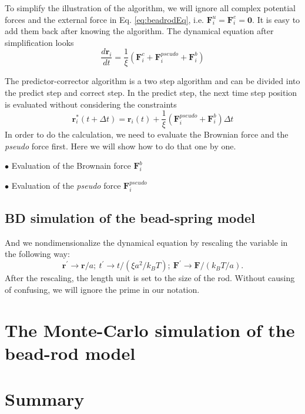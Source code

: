 To simplify the illustration of the algorithm, we will ignore all complex potential forces and the external force in Eq. \eqref{eq:beadrodEq}, i.e. $\mathbf{F}_i^{u} = \mathbf{F}_i^{e} = \mathbf{0}$. It is easy to add them back after knowing the algorithm. The dynamical equation after simplification looks 
\begin{equation}
    \label{eq:beadrodSimple}
    \frac{d \mathbf{r}_i}{d t} = \frac{1}{\xi}\left(\mathbf{F}_i^{c} + \mathbf{F}_i^{pseudo} + \mathbf{F}_i^{b}\right)
\end{equation}

The predictor-corrector algorithm is a two step algorithm and can be divided into the predict step and correct step. In the predict step, the next time step position is evaluated without considering the constraints
\begin{equation}
    \label{eq:beadrodPredict}
    \mathbf{r}_i^*(t+\Delta t) = \mathbf{r}_i(t) + \frac{1}{\xi}(\mathbf{F}_i^{pseudo} + \mathbf{F}_i^{b})\Delta t
\end{equation}
In order to do the calculation, we need to evaluate the Brownian force and the \emph{pseudo} force first. Here we will show how to do that one by one.

$\bullet$ Evaluation of the Brownain force $\mathbf{F}_i^{b}$


$\bullet$ Evaluation of the \emph{pseudo} force $\mathbf{F}_i^{pseudo}$


\subsection{BD simulation of the bead-spring model}
\label{sub:bd_of_bead_spring_model}

And we nondimensionalize the dynamical equation by rescaling the variable in the following way:
\begin{equation}
    \label{eq:dimensionless}
    \mathbf{r}^{\prime}\to \mathbf{r}/a;~t^{\prime}\to t/(\xi a^2/k_BT);~\mathbf{F}^{\prime}\to\mathbf{F}/(k_BT/a).
\end{equation}
After the rescaling, the length unit is set to the size of the rod. Without causing of confusing, we will ignore the prime in our notation. 



\section{The Monte-Carlo simulation of the bead-rod model}
\label{sec:the_monte_carlo_simulation_of_the_bead_rod_model}



\section{Summary}
\label{sec:summary}



